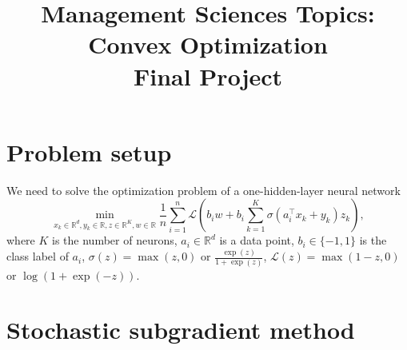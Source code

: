 \documentclass{article}
\numberwithin{equation}{section}
\numberwithin{figure}{section}
\begin{document}
\title{Management Sciences Topics: Convex Optimization\\ Final Project}
\date{}
\maketitle

\section{Problem setup}

We need to solve the optimization problem of a one-hidden-layer neural network
\begin{equation}
\min_{x_k\in\mathbb{R}^d, y_k\in\mathbb{R}, z\in\mathbb{R}^K, w\in\mathbb{R}} \frac{1}{n}\sum_{i=1}^{n}\mathcal{L}\left(b_iw+b_i\sum_{k=1}^K \sigma(a_i^\top x_k + y_k)z_k\right),
\end{equation}
where $K$ is the number of neurons, $a_i\in\mathbb{R}^d $ is a data point, $b_i\in\{-1, 1\} $ is the class label of $a_i $, $\sigma(z) = \max(z, 0) $ or $\frac{\exp(z)}{1+\exp(z)}$, $\mathcal{L}(z) = \max(1-z, 0)$ or $\log(1+\exp(-z))$.

\section{Stochastic subgradient method}


\end{document}
